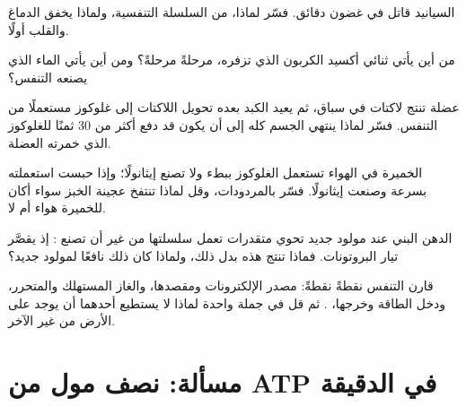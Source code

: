 \begin{exercise}[$\star\star$]\label{exo:g12:respiration-fermentation:10}
السيانيد قاتل في غضون دقائق. فسّر لماذا، من السلسلة التنفسية، ولماذا
يخفق الدماغ والقلب أولًا.
\end{exercise}

\begin{exercise}[$\star\star$]\label{exo:g12:respiration-fermentation:11}
من أين يأتي ثنائي أكسيد الكربون الذي تزفره، مرحلةً مرحلةً؟ ومن أين
يأتي الماء الذي يصنعه التنفس؟
\end{exercise}

\begin{exercise}[$\star\star\star$]\label{exo:g12:respiration-fermentation:12}
عضلة تنتج لاكتات في سباق، ثم يعيد الكبد بعده تحويل اللاكتات إلى
غلوكوز مستعملًا  من التنفس. فسّر لماذا ينتهي الجسم كله إلى أن يكون
قد دفع أكثر من 30  ثمنًا للغلوكوز الذي خمرته العضلة.
\end{exercise}

\begin{exercise}[$\star\star\star$]\label{exo:g12:respiration-fermentation:13}
الخميرة في الهواء تستعمل الغلوكوز ببطء ولا تصنع إيثانولًا؛ وإذا حبست
استعملته بسرعة وصنعت إيثانولًا. فسّر بالمردودات، وقل لماذا تنتفخ عجينة
الخبز سواء أكان للخميرة هواء أم لا.
\end{exercise}

\begin{exercise}[$\star\star\star$]\label{exo:g12:respiration-fermentation:14}
 الدهن البني عند مولود جديد تحوي متقدرات تعمل سلسلتها من غير أن
تصنع : إذ يقصَّر تيار البروتونات. فماذا تنتج هذه  بدل ذلك،
ولماذا كان ذلك نافعًا لمولود جديد؟
\end{exercise}

\begin{exercise}[$\star\star\star$]\label{exo:g12:respiration-fermentation:15}
قارن التنفس  نقطةً نقطةً: مصدر الإلكترونات ومقصدها،
والغاز المستهلك والمتحرر، ودخل الطاقة وخرجها، . ثم قل في جملة
واحدة لماذا لا يستطيع أحدهما أن يوجد على الأرض من غير الآخر.
\end{exercise}

\section{مسألة: نصف مول من ATP في الدقيقة}

